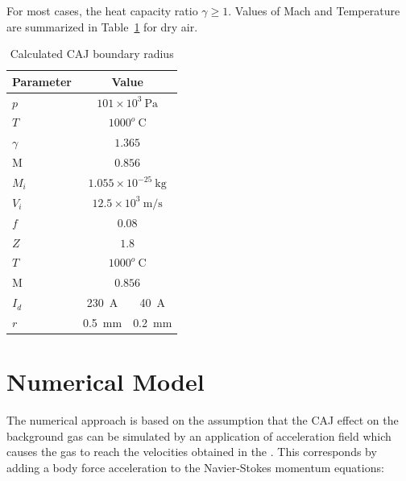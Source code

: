 \documentclass[a4paper]{iacas}%
\begin{document}
For most cases, the heat capacity ratio $\gamma \geq 1$. %
Values of Mach and Temperature are summarized in Table~\ref{t:radii} for dry air.

\begin{table}[hbt]
	\begin{center}
		\begin{threeparttable}
			\caption{Calculated CAJ boundary radius}
			\label{t:radii}
			\begin{tabular}{lc|c}
				Parameter &
				\multicolumn{2}{c}{Value}\\\hline
				$p$ & \multicolumn{2}{c}{$101 \times 10^3~\mathrm{Pa} $} \\
				$T$	& \multicolumn{2}{c}{$1000^o~\mathrm{C}$} \\
				$\gamma$ & \multicolumn{2}{c}{$1.365$} \\ 
				$\mathrm{M}$	& \multicolumn{2}{c}{$0.856$} \\
				$M_i$  	& \multicolumn{2}{c}{$1.055 \times 10^{-25}~\mathrm{kg} $}  \\
				$V_i$ 	& \multicolumn{2}{c}{$12.5 \times 10^3~\mathrm{m/s} $}  \\
				$f$ 	& \multicolumn{2}{c}{$0.08 $} \\
				$Z$	& \multicolumn{2}{c}{$1.8 $} \\
				$T$	& \multicolumn{2}{c}{$1000^o~\mathrm{C}$} \\
				$\mathrm{M}$	& \multicolumn{2}{c}{$0.856$} \\
				$I_d$  & 230~A & 40~A\\
				$r$ 	& 0.5~mm & 0.2~mm
			\end{tabular}
		\end{threeparttable}
	\end{center}
\end{table}

\section{Numerical Model}

The numerical approach is based on the assumption that the CAJ effect on the background gas can be simulated by an application of acceleration field which causes the gas to reach the velocities obtained in the \cite{KR}. This corresponds by adding a body force acceleration to the Navier-Stokes momentum equations:
\end{document}
